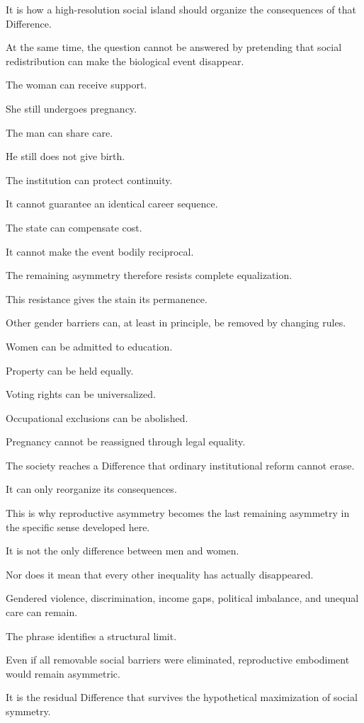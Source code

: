 It is how a high-resolution social island should organize the consequences of that Difference.

At the same time, the question cannot be answered by pretending that social redistribution can make the biological event disappear.

The woman can receive support.

She still undergoes pregnancy.

The man can share care.

He still does not give birth.

The institution can protect continuity.

It cannot guarantee an identical career sequence.

The state can compensate cost.

It cannot make the event bodily reciprocal.

The remaining asymmetry therefore resists complete equalization.

This resistance gives the stain its permanence.

Other gender barriers can, at least in principle, be removed by changing rules.

Women can be admitted to education.

Property can be held equally.

Voting rights can be universalized.

Occupational exclusions can be abolished.

Pregnancy cannot be reassigned through legal equality.

The society reaches a Difference that ordinary institutional reform cannot erase.

It can only reorganize its consequences.

This is why reproductive asymmetry becomes the last remaining asymmetry in the specific sense developed here.

It is not the only difference between men and women.

Nor does it mean that every other inequality has actually disappeared.

Gendered violence, discrimination, income gaps, political imbalance, and unequal care can remain.

The phrase identifies a structural limit.

Even if all removable social barriers were eliminated, reproductive embodiment would remain asymmetric.

It is the residual Difference that survives the hypothetical maximization of social symmetry.

